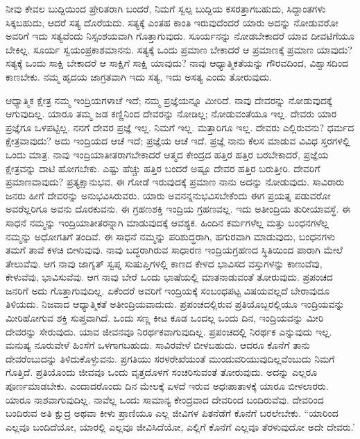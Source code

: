 ನೀವು ಕೇವಲ ಬುದ್ದಿಯಿಂದ ಪ್ರೇರಿತರಾಗಿ ಬಂದರೆ, ನಿಮಗೆ ಸ್ವಲ್ಪ ಬುದ್ದಿಯ ಕಸರತ್ತಾಗಬಹುದು, ಸಿದ್ದಾಂತಗಳು ಸಿಕ್ಕಬಹುದು, ಆದರೆ ಸತ್ಯ ದೊರೆಯದು. ಸತ್ಯಕ್ಕೆ ಎಂತಹ ಕಾಂತಿ ಇರುವುದೆಂದರೆ ಯಾರು ಅದನ್ನು ನೋಡುವರೋ ಅವರಿಗೆ ಇದು ಸತ್ಯವೆಂದು ನಿಸ್ಸಂಶಯವಾಗಿ ಗೊತ್ತಾಗುವುದು. ಸೂರ್ಯನನ್ನು ನೋಡಬೇಕಾದರೆ ಯಾವ ದೀವಟಿಗೆಯೂ ಬೇಕಿಲ್ಲ. ಸೂರ್ಯ ಸ್ವಯಂಪ್ರಕಾಶಮಾನನು. ಸತ್ಯಕ್ಕೆ ಒಂದು ಪ್ರಮಾಣ ಬೇಕಾದರೆ ಆ ಪ್ರಮಾಣಕ್ಕೆ ಪ್ರಮಾಣ ಯಾವುದು? ಸತ್ಯಕ್ಕೆ ಒಂದು ಸಾಕ್ಷಿ ಬೇಕಾದರೆ ಆ ಸಾಕ್ಷಿಗೆ ಸಾಕ್ಷಿ ಯಾವುದು? ನಾವು ಆಧ್ಯಾತ್ಮಿಕತೆಯನ್ನು ಗೌರವದಿಂದ, ವಿಶ್ವಾಸದಿಂದ ಕಾಣಬೇಕು. ನಮ್ಮ ಹೃದಯ ಜಾಗ್ರತವಾಗಿ ಇದು ಸತ್ಯ, ಇದು ಅಸತ್ಯ ಎಂದು ತೋರುವುದು.

ಆಧ್ಯಾತ್ಮಿಕ ಕ್ಷೇತ್ರ ನಮ್ಮ ಇಂದ್ರಿಯಗಳಾಚೆ ಇದೆ; ನಮ್ಮ ಪ್ರಜ್ಞೆಯನ್ನೂ ಮೀರಿದೆ. ನಾವು ದೇವರನ್ನು ನೋಡುವುದಕ್ಕೆ ಆಗುವುದಿಲ್ಲ. ಯಾರೂ ತಮ್ಮ ಜಡ ಕಣ್ಣಿನಿಂದ ದೇವರನ್ನು ನೋಡಿಲ್ಲ; ನೋಡುವಂತೆಯೂ ಇಲ್ಲ. ದೇವರು ಯಾರ ಪ್ರಜ್ಞೆಗೂ ಒಳಪಟ್ಟಿಲ್ಲ. ನನಗೆ ದೇವರ ಪ್ರಜ್ಞೆ ಇಲ್ಲ. ನಿಮಗೆ ಇಲ್ಲ. ಮತ್ತಾರಿಗೂ ಇಲ್ಲ. ದೇವರು ಎಲ್ಲಿರುವನು? ಧರ್ಮದ ಕ್ಷೇತ್ರವಾವುದು? ಅದು ಇಂದ್ರಿಯದ ಆಚೆ ಇದೆ; ಪ್ರಜ್ಞೆಯ ಆಚೆ ಇದೆ. ಪ್ರಜ್ಞೆ ನಾನು ಕೆಲಸ ಮಾಡುವ ವಿವಿಧ ಸ್ತರಗಳಲ್ಲಿ ಒಂದು ಮಾತ್ರ. ನಾವು ಇಂದ್ರಿಯಾತೀತರಾಗಬೇಕಾದರೆ ಆತ್ಮದ ಕೇಂದ್ರದ ಹತ್ತಿರ ಹತ್ತಿರ ಬರಬೇಕಾದರೆ, ಪ್ರಜ್ಞೆಯ ಕ್ಷೇತ್ರವನ್ನು ದಾಟಿ ಹೋಗಬೇಕು. ಎಷ್ಟು ಹೆಚ್ಚು ಹತ್ತಿರ ಬಂದರೆ ಅಷ್ಟೂ ದೇವರ ಹತ್ತಿರ ಬರುತ್ತೀರಿ. ದೇವರಿಗೆ ಪ್ರಮಾಣವಾವುದು? ಪ್ರತ್ಯಕ್ಷಾನುಭವ. ಈ ಗೋಡೆ ಇರುವುದಕ್ಕೆ ಪ್ರಮಾಣ ನಾನು ಅದನ್ನು ನೋಡುವುದು. ಸಾವಿರಾರು ಜನರು ಹೀಗೆ ದೇವರನ್ನು ಅನುಭವಿಸಿರುವರು. ಯಾರು ಅವನನ್ನನುಭವಿಸಬೇಕೆಂದು ಈಗ ಪ್ರಯತ್ನ ಪಡುವರೋ ಅವರೆಲ್ಲರಿಗೂ ಅವನು ದೊರಕುವನು. ಈ ಗ್ರಹಣಶಕ್ತಿ ಇಂದ್ರಿಯ ಗ್ರಹಣವಲ್ಲ. ಇದು ಅತೀಂದ್ರಿಯ ತುರೀಯಾವಸ್ಥೆ. ಈ ಸಾಧನೆ ನಮ್ಮನ್ನು ಇಂದ್ರಿಯಾತೀತರನ್ನಾಗಿ ಮಾಡುವುದಕ್ಕೆ ಆವಶ್ಯಕ. ಹಿಂದಿನ ಕರ್ಮಗಳೆಲ್ಲ ಮತ್ತು ಬಂಧನಗಳೆಲ್ಲ ನಮ್ಮನ್ನು ಅಧೋಗತಿಗೆ ತಂದಿವೆ. ಈ ಸಾಧನೆ ನಮ್ಮನ್ನು ಪರಿಶುದ್ಧರಾಗಿ, ಹಗುರವಾಗಿ ಮಾಡುವುದು, ಬಂಧನಗಳು ತಮಗೆ ತಾವೆ ಕಳಚಿ ಬೀಳುವುವು. ನಾವು ಬದ್ಧರಾಗಿರುವ ಸಾಧಾರಣ ಇಂದ್ರಿಯಗ್ರಹಣದ ಸ್ಥಿತಿಯಿಂದ ಪಾರಾಗಿ ಮೇಲೆ ತೇಲುವೆವು. ಆಗ ನಾವು ಜಾಗೃತ್ ಸ್ವಪ್ನ ಸುಷುಪ್ತಿಗಳಲ್ಲಿ ಕಾಣದ ಕೇಳದ ಭಾವಿಸದ ವಸ್ತುಗಳನ್ನು ಕಾಣುವೆವು, ಕೇಳುವೆವು, ಭಾವಿಸುವೆವು. ಆಗ ನಾವು ಬೇರೆ ಒಂದು ಭಾಷೆಯಲ್ಲಿ ಮಾತನಾಡುವಂತೆ ತೋರುವುದು. ಪ್ರಪಂಚದ ಜನರಿಗೆ ಅದು ಗೊತ್ತಾಗುವುದಿಲ್ಲ. ಏಕೆಂದರೆ ಅವರಿಗೆ ಇಂದ್ರಿಯಕ್ಕೆ ಸಂಬಂಧಪಟ್ಟ ವಿಷಯವಲ್ಲದೆ ಬೇರಾವುದೂ ತಿಳಿಯದು. ನಿಜವಾದ ಆಧ್ಯಾತ್ಮಿಕತೆ ಅತೀಂದ್ರಿಯವಾದುದು. ಪ್ರಪಂಚದಲ್ಲಿರುವ ಪ್ರತಿಯೊಬ್ಬರಲ್ಲಿಯೂ ಇಂದ್ರಿಯವನ್ನು ಮೀರಿಹೋಗುವ ಶಕ್ತಿ ಸುಪ್ತವಾಗಿದೆ. ಒಂದು ಸಣ್ಣ ಕೀಟ ಕೂಡ ಒಂದಲ್ಲ ಒಂದು ದಿನ, ಇಂದ್ರಿಯವನ್ನು ಮೀರಿ ದೇವರನ್ನು ಸೇರುವುದು. ಯಾವ ಜೀವನವೂ ನಿರರ್ಥಕವಾಗುವುದಿಲ್ಲ. ಪ್ರಪಂಚದಲ್ಲಿ ನಿರರ್ಥಕ ಎನ್ನುವುದು ಇಲ್ಲ. ಮನುಷ್ಯ ನೂರುವೇಳೆ ಹಿಂಸೆಗೆ ಒಳಗಾಗಬಹುದು. ಸಾವಿರವೇಳೆ ಬೀಳಬಹುದು. ಆದರೂ ಕೊನೆಗೆ ತಾನು ದೇವರೆಂಬುದನ್ನು ತಿಳಿದುಕೊಳ್ಳುವನು. ಪ್ರಗತಿಯು ಸರಳರೇಖೆಯಂತೆ ಮುಂದುವರಿಯುವುದಿಲ್ಲವೆಂಬುದು ನಿಮಗೆ ಗೊತ್ತಿದೆ. ಪ್ರತಿಯೊಂದು ಜೀವವೂ ಒಂದು ವೃತ್ತದೊಳಗೆ ಸಂಚರಿಸುವಂತೆ ತೋರುವುದು. ಅದನ್ನು ಎಲ್ಲರೂ ಪೂರ್ಣಮಾಡಬೇಕು. ಎಂದಾದರೊಂದು ದಿನ ಮೇಲಕ್ಕೆ ಏಳದೆ ಇರುವ ಅಧಃಪಾತಾಳಕ್ಕೆ ಯಾರೂ ಬೀಳಲಾರರು. ಯಾರೂ ನಾಶವಾಗುವುದಿಲ್ಲ. ನಾವೆಲ್ಲ ಒಂದು ಸಾಮಾನ್ಯ ಕೇಂದ್ರವಾದ ದೇವರಿಂದ ಬಂದಿರುವೆವು. ದೇವರಿಂದ ಬಂದಿರುವ ಅತಿ ಕ್ಷುದ್ರ ಅಥವಾ ಕೀಳು ಪ್ರಾಣಿಯೂ ಎಲ್ಲ ಜೀವಿಗಳ ಪಿತನೆಡೆಗೆ ಕೊನೆಗೆ ಬರಲೇಬೇಕು. “ಯಾರಿಂದ ಎಲ್ಲವೂ ಬಂದಿದೆಯೋ, ಯಾರಲ್ಲಿ ಎಲ್ಲವೂ ಜೀವಿಸಿದೆಯೋ, ಎಲ್ಲಿಗೆ ಕೊನೆಗೆ ಎಲ್ಲವೂ ತೆರಳುವುದೋ ಅದೇ ದೇವರು.'

